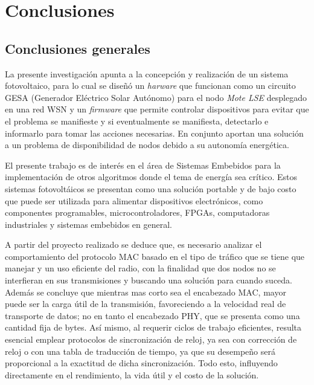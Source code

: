 
\chapter{Conclusiones} %

\label{Chapter5} %

\section{Conclusiones generales}

La presente investigación apunta a la concepción y realización de un sistema fotovoltaico, para lo cual se diseñó un \textit{harware} que funcionan como un circuito GESA (Generador Eléctrico Solar Autónomo) para el nodo \textit{Mote LSE} desplegado en una red WSN y un \textit{firmware} que permite controlar dispositivos para evitar que el problema se manifieste y si eventualmente se manifiesta, detectarlo e informarlo para tomar las acciones necesarias. En conjunto aportan una solución a un problema de disponibilidad de nodos debido a su autonomía energética.

El presente trabajo es de interés en el área de Sistemas Embebidos para la implementación de otros algoritmos donde el tema de energía sea crítico. Estos sistemas fotovoltáicos se presentan como una solución portable y de bajo costo que puede ser utilizada para alimentar dispositivos electrónicos, como componentes programables, microcontroladores, FPGAs, computadoras industriales y sistemas embebidos en general.

A partir del proyecto realizado se deduce que, es necesario analizar el comportamiento del protocolo MAC basado en el tipo de tráfico que se tiene que manejar y un uso eficiente del radio, con la finalidad que dos nodos no se interfieran en sus transmisiones y buscando una solución para cuando suceda. Además se concluye que mientras mas corto sea el encabezado MAC, mayor puede ser la carga útil de la transmisión, favoreciendo a la velocidad real de transporte de datos; no en tanto el encabezado PHY, que se presenta como una cantidad fija de bytes. Así mismo, al requerir ciclos de trabajo eficientes, resulta esencial emplear protocolos de sincronización de reloj, ya sea con corrección de reloj o con una tabla de traducción de tiempo, ya que su desempeño será proporcional a la exactitud de dicha sincronización. Todo esto, influyendo directamente en el rendimiento, la vida útil y el costo de la solución.

